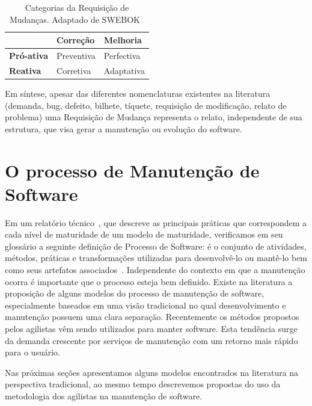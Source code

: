 \begin{table}[htpb] \centering 	\begin{tabular}{l|l|l|} \cline{2-3} &
		\textbf{Correção} & \textbf{Melhoria} \\ \hline
		\multicolumn{1}{|l|}{\textbf{Pró-ativa}} & Preventiva & Perfectiva \\
		\hline \multicolumn{1}{|l|}{\textbf{Reativa}} & Corretiva & Adaptativa
		\\ \hline \end{tabular}\caption{Categorias da Requisição de Mudanças.
		Adaptado de
		SWEBOK~\cite{4425813}}\label{tab:categorias_requisicao_mudanca}
\end{table}

Em síntese, apesar das diferentes nomenclaturas existentes na literatura
(demanda, bug, defeito, bilhete, tíquete, requisição de modificação, relato de
problema) uma Requisição de Mudança representa o relato, independente de sua
estrutura, que visa gerar a manutenção ou evolução do software.

\section{O processo de Manutenção de Software}
\label{sec:o_processo_de_manutecao_de_software}

Em um relatório técnico~\cite{paulk1993key}, que descreve as principais práticas que
correspondem a cada nível de maturidade de um modelo de maturidade, verificamos
em seu glossário a seguinte definição de Processo de Software: é o conjunto de
atividades, métodos, práticas e transformações utilizadas para desenvolvê-lo ou
mantê-lo bem como seus artefatos associados~\cite{paulk1993key}. Independente do
contexto em que a manutenção ocorra é importante que o processo esteja bem
definido. Existe na literatura a proposição de alguns modelos do processo de
manutenção de software, especialmente baseados em uma visão tradicional no qual
desenvolvimento e manutenção possuem uma clara separação. Recentemente os
métodos propostos pelos agilistas vêm sendo utilizados para manter software.
Esta tendência surge da demanda crescente por serviços de manutenção com um
retorno mais rápido para o usuário.

Nas próximas seções apresentamos alguns modelos encontrados na literatura na
perspectiva tradicional, ao mesmo tempo descrevemos propostas do uso da
metodologia dos agilistas na manutenção de software.

